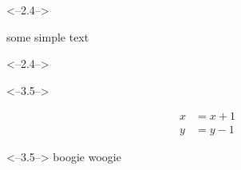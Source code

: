 <--2.4-->

some simple text

<--2.4-->



<--3.5-->

\begin{align*}

x &= x + 1 \\
y &= y - 1

\end{align*}

<--3.5-->
boogie woogie
